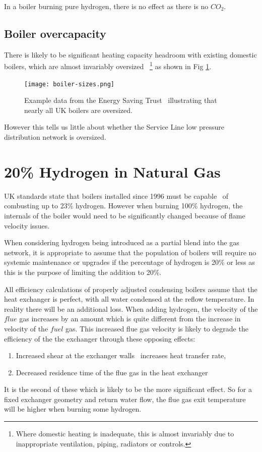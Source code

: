\documentclass[5p]{elsarticle} %
\begin{document}
In a boiler burning pure hydrogen, there is no effect as there is no $CO_2$.

\subsection{Boiler overcapacity}
\label{appendix:boilerovercap}
There is likely to be significant heating capacity headroom with existing domestic boilers, which are almost invariably oversized~\citep{Bennett2020}
\footnote{Where domestic heating is inadequate, this is almost invariably due to inappropriate ventilation, piping, radiators or controls.}
as shown in Fig \ref{fig-oversize}. 

\begin{figure}[ht]
\centering
\texttt{[image: boiler-sizes.png]}
\caption{Example data from the Energy Saving Trust~\citep{GASTEC2009} illustrating that nearly all UK boilers are oversized.}
\label{fig-oversize}
\end{figure}
However this tells us little about whether the Service Line low pressure distribution network is oversized.

\section{20\% Hydrogen in Natural Gas}
\label{sec:H20-percent}

 UK standards state that boilers installed since 1996 must be capable~\citep{H2Blends21} of combusting up to 23\% hydrogen. However when burning 100\% hydrogen, the internals of the boiler would need to be significantly changed because of flame velocity issues.

When considering hydrogen being introduced as a partial blend into the gas network, it is appropriate to assume that the population of boilers will require no systemic maintenance or upgrades if the percentage of hydrogen is 20\% or less as this is the purpose of limiting the addition to 20\%.

All efficiency calculations of properly adjusted condensing boilers assume that the heat exchanger is perfect, with all water condensed at the reflow temperature. In reality there will be an additional loss. When adding hydrogen, the velocity of the $flue$ gas increases by an amount which is quite different from the increase in velocity of the $fuel$ gas. This increased flue gas velocity is likely to degrade the efficiency of the the  exchanger through these opposing effects:

\begin{enumerate}
    \item Increased shear at the exchanger walls~\citep{Bennet2017} increases heat transfer rate,
    \item Decreased residence time of the flue gas in the heat exchanger
\end{enumerate}
It is the second of these which is likely to be the more significant effect. So for a fixed exchanger geometry and return water flow, the flue gas exit temperature will be higher when burning some hydrogen.
\end{document}
